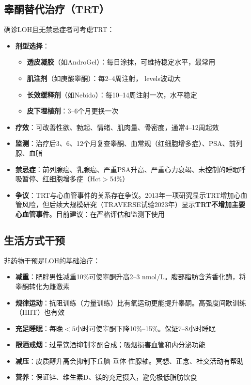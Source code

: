 \begin{enumerate}
\subsection{睾酮替代治疗（TRT）}

确诊LOH且无禁忌症者可考虑TRT：

\begin{itemize}[leftmargin=2cm]
	\item \textbf{剂型选择}：
		\begin{itemize}
		\item \textbf{透皮凝胶}（如AndroGel）：每日涂抹，可维持稳定水平，最常用
		\item \textbf{肌注剂}（如庚酸睾酮）：每2--4周注射， levels波动大
		\item \textbf{长效缓释剂}（如Nebido）：每10--14周注射一次，水平稳定
		\item \textbf{皮下埋植剂}：3--6个月更换一次
		\end{itemize}
	\item \textbf{疗效}：可改善性欲、勃起、情绪、肌肉量、骨密度，通常4--12周起效
	\item \textbf{监测}：治疗后3、6、12个月复查睾酮、血常规（红细胞增多症）、PSA、前列腺、血脂
	\item \textbf{禁忌症}：前列腺癌、乳腺癌、严重PSA升高、严重心力衰竭、未控制的睡眠呼吸暂停、红细胞增多症（Hct$>$54\%）
	\item \textbf{争议}：TRT与心血管事件的关系存在争议。2013年一项研究显示TRT增加心血管风险，但后续大规模研究（TRAVERSE试验2023年）显示\textbf{TRT不增加主要心血管事件}。目前建议：在严格评估和监测下使用
\end{itemize}

\subsection{生活方式干预}

非药物干预是LOH的基础治疗：

\begin{itemize}[leftmargin=2cm]
	\item \textbf{减重}：肥胖男性减重10\%可使睾酮升高2--3 nmol/L。腹部脂肪含芳香化酶，将睾酮转化为雌激素
	\item \textbf{规律运动}：抗阻训练（力量训练）比有氧运动更能提升睾酮。高强度间歇训练（HIIT）也有效
	\item \textbf{充足睡眠}：每晚$<5$小时可使睾酮下降10\%--15\%。保证7--8小时睡眠
	\item \textbf{限酒戒烟}：过量饮酒抑制睾酮合成；吸烟损害血管和内分泌功能
	\item \textbf{减压}：皮质醇升高会抑制下丘脑-垂体-性腺轴。冥想、正念、社交活动有帮助
	\item \textbf{营养}：保证锌、维生素D、镁的充足摄入，避免极低脂肪饮食
\end{itemize}


\end{enumerate}
